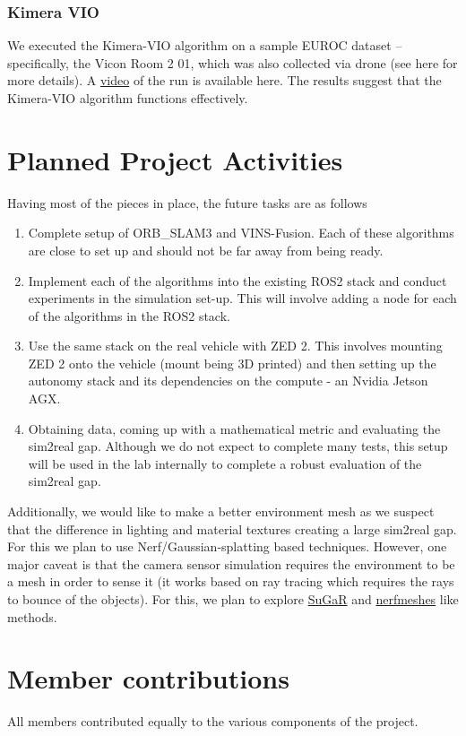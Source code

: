 \documentclass{article}
\begin{document}
\subsubsection*{Kimera VIO}
We executed the Kimera-VIO algorithm on a sample EUROC dataset – specifically, the Vicon Room 2 01, which was also collected via drone (see here for more details). A \href{https://uwmadison.box.com/s/6fg0vdrrqs0u74fcvunobefagvzrdkbu}{video} of the run is available here. The results suggest that the Kimera-VIO algorithm functions effectively.

\section{Planned Project Activities}
Having most of the pieces in place, the future tasks are as follows
\begin{enumerate}
    \item Complete setup of ORB\_SLAM3 and VINS-Fusion. Each of these algorithms are close to set up and should not be far away from being ready. 
    \item Implement each of the algorithms into the existing ROS2 stack and conduct experiments in the simulation set-up. This will involve adding a node for each of the algorithms in the ROS2 stack.
    \item Use the same stack on the real vehicle with ZED 2. This involves mounting ZED 2 onto the vehicle (mount being 3D printed) and then setting up the autonomy stack and its dependencies on the compute - an Nvidia Jetson AGX.
    \item Obtaining data, coming up with a mathematical metric and evaluating the sim2real gap. Although we do not expect to complete many tests, this setup will be used in the lab internally to complete a robust evaluation of the sim2real gap.
\end{enumerate}
Additionally, we would like to make a better environment mesh as we suspect that the difference in lighting and material textures creating a large sim2real gap. For this we plan to use Nerf/Gaussian-splatting based techniques. However, one major caveat is that the camera sensor simulation requires the environment to be a mesh in order to sense it (it works based on ray tracing which requires the rays to bounce of the objects). For this, we plan to explore \href{https://github.com/Anttwo/SuGaR}{SuGaR} and \href{https://github.com/qway/nerfmeshes}{nerfmeshes} like methods.  

\section{Member contributions}
All members contributed equally to the various components of the project.
\end{document}
